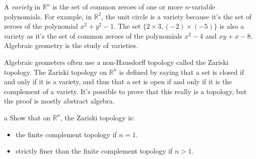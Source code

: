 \documentclass[11pt]{article}
\begin{document}

A \emph{variety} in $\mathbb{R}^n$ is the set of common zeroes of one or more
$n$-variable polynomials. For example, in $\mathbb{R}^2$, the unit circle is a
variety because it's the set of zeroes of the polynomial $x^2 + y^2 - 1$. The
set $\{2 \times 3, (-2) \times (-5)\}$ is also a variety as it's the set of
common zeroes of the polynomials $x^2 -4$  and $xy + x - 8$. Algebraic geometry
is the study of varieties.

Algebraic geometers often use a non-Hausdorff topology called the Zariski
topology. The Zariski topology on $\mathbb{R}^n$ is defined by saying that a set
is closed if and only if it is a variety, and thus that a set is open if and
only if it is the complement of a variety. It's possible to prove that this
really is a topology, but the proof is mostly abstract algebra.

\begin{p}{a}
  Show that on $\mathbb{R}^n$, the Zariski topology is:
  \begin{itemize}
    \item the finite complement topology if $n = 1$.
    \item strictly finer than the finite complement topology if $n > 1$.
  \end{itemize}
\end{p}
\end{document}
